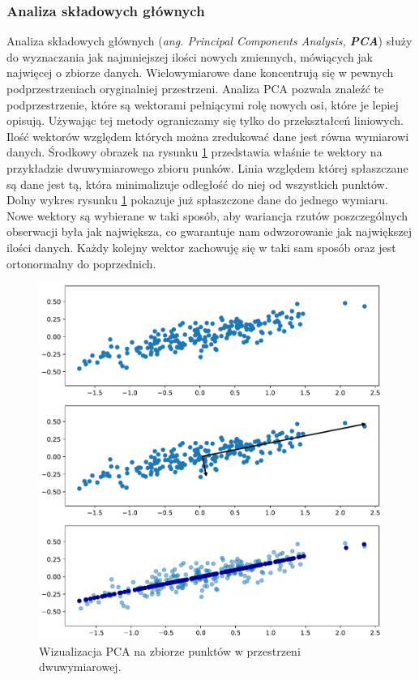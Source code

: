 \documentclass[a4paper,12pt]{book} %
\begin{document}
\subsubsection{Analiza składowych głównych}
Analiza składowych głównych (\textit{ang. Principal Components Analysis, \textbf{PCA}}) służy do wyznaczania jak najmniejszej ilości nowych zmiennych, mówiących jak najwięcej o zbiorze danych. Wielowymiarowe dane koncentrują się w pewnych podprzestrzeniach oryginalniej przestrzeni. Analiza PCA pozwala znaleźć te podprzestrzenie, które są wektorami pełniącymi rolę nowych osi, które je lepiej opisują.\cite{redukcjawymiarow} Używając tej metody ograniczamy się tylko do przekształceń liniowych. Ilość wektorów względem których można zredukować dane jest równa wymiarowi danych. Środkowy obrazek na rysunku \ref{fig:pca} przedstawia właśnie te wektory na przykładzie dwuwymiarowego zbioru punków. Linia względem której spłaszczane są dane jest tą, która minimalizuje odległość do niej od wszystkich punktów. Dolny wykres rysunku \ref{fig:pca} pokazuje już spłaszczone dane do jednego wymiaru. Nowe wektory są wybierane w taki sposób, aby wariancja rzutów poszczególnych obserwacji była jak największa, co gwarantuje nam odwzorowanie jak największej ilości danych. Każdy kolejny wektor zachowuję się w taki sam sposób oraz jest ortonormalny do poprzednich.
\begin{figure}[h!]
	\centering
	\includegraphics[width=\textwidth]{pca.pdf}
	\caption{Wizualizacja PCA na zbiorze punktów w przestrzeni dwuwymiarowej.}
	\label{fig:pca}
\end{figure}
\end{document}
